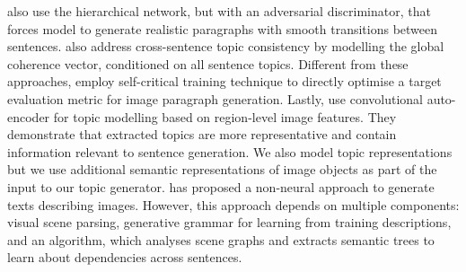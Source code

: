 \documentclass[11pt,a4paper]{article}
\begin{document}
 also use the hierarchical network, but with an adversarial discriminator, that forces model to generate realistic paragraphs with smooth transitions between sentences.
 also address cross-sentence topic consistency by modelling the global coherence vector, conditioned on all sentence topics.
Different from these approaches,  employ self-critical training technique \cite{selfcritical2016} to directly optimise a target evaluation metric for image paragraph generation.
Lastly,  use convolutional auto-encoder for topic modelling based on region-level image features.
They demonstrate that extracted topics are more representative and contain information relevant to sentence generation.
We also model topic representations but we use additional semantic representations of image objects as part of the input to our topic generator.
 has proposed a non-neural approach to generate texts describing images.
However, this approach %
depends on multiple components: visual scene parsing, generative grammar for learning from training descriptions, and an algorithm, which analyses scene graphs and extracts semantic trees to learn about dependencies across sentences.
\end{document}
